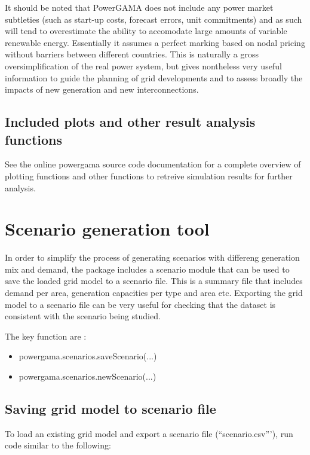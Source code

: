\documentclass{article}
\begin{document}
It should be noted that PowerGAMA does not include any power market subtleties (such as start-up costs, forecast errors, unit commitments) and as such will tend to overestimate the ability to accomodate large amounts of variable renewable energy. Essentially it assumes a perfect marking based on nodal pricing without barriers between different countries. This is naturally a gross oversimplification of the real power system, but gives nontheless very useful information to guide the planning of grid developments and to assess broadly the impacts of new generation and new interconnections.


\subsection{Included plots and other result analysis functions}

See the online  powergama source code documentation for a complete overview of plotting functions and other functions to retreive simulation results for further analysis.


\section{Scenario generation tool}

In order to simplify the process of generating scenarios with differeng generation mix and demand, the package includes a scenario module that can be used to save the loaded grid model to a scenario file. This is a summary file that includes demand per area, generation capacities per type and area etc. Exporting the grid model to a scenario file can be very useful for checking that the dataset is consistent with the scenario being studied.

The key function are :
\begin{itemize}
\item powergama.scenarios.saveScenario(...)
\item powergama.scenarios.newScenario(...)
\end{itemize}


\subsection{Saving grid model to scenario file}
To load an existing grid model and export a scenario file (``scenario.csv'''), run code similar to the following:
\end{document}
